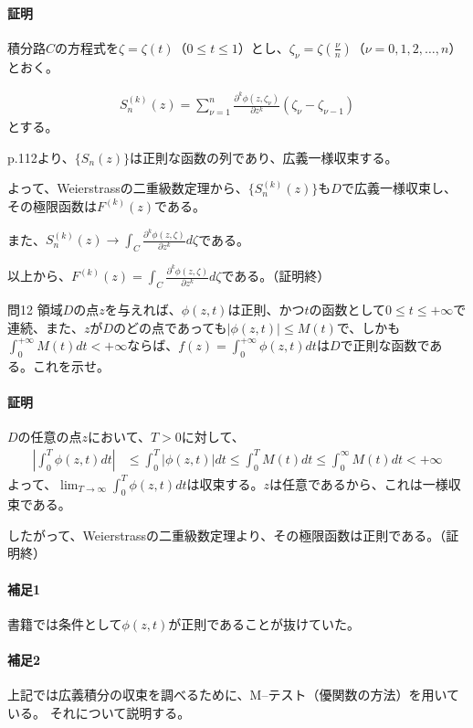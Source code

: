 \paragraph{証明}
積分路$C$の方程式を$\zeta=\zeta(t)$（$0\le t\le1$）とし、$\zeta_\nu=\zeta(\frac{\nu}{n})$（$\nu=0,1,2,\dots,n$）とおく。

\begin{align*}
    S^{(k)}_n(z)=\sum_{\nu=1}^{n}\frac{\partial^k \phi(z,\zeta_\nu)}{\partial z^k}(\zeta_\nu-\zeta_{\nu-1})
\end{align*}
とする。

p.112より、$\{S_n(z)\}$は正則な函数の列であり、広義一様収束する。

よって、Weierstrassの二重級数定理から、$\{S^{(k)}_n(z)\}$も$D$で広義一様収束し、その極限函数は$F^{(k)}(z)$である。

また、$S^{(k)}_n(z)\longrightarrow\int_{C}\frac{\partial^k\phi(z,\zeta)}{\partial z^k}d\zeta$である。

以上から、$F^{(k)}(z)=\int_{C}\frac{\partial^k\phi(z,\zeta)}{\partial z^k}d\zeta$である。（証明終）

\begin{mysimplebox}{問12}
    領域$D$の点$z$を与えれば、$\phi(z,t)$は正則、かつ$t$の函数として$0\le t\le+\infty$で連続、また、$z$が$D$のどの点であっても$|\phi(z,t)|\le M(t)$で、しかも$\int_{0}^{+\infty}M(t)dt<+\infty$ならば、$f(z)=\int_{0}^{+\infty}\phi(z,t)dt$は$D$で正則な函数である。これを示せ。
\end{mysimplebox}
\paragraph{証明}
$D$の任意の点$z$において、$T>0$に対して、
\begin{align*}
    \left|\int_{0}^{T}\phi(z,t)dt\right|
    &\le\int_{0}^{T}|\phi(z,t)|dt
    \le\int_{0}^{T}M(t)dt
    \le\int_{0}^{\infty}M(t)dt<+\infty
\end{align*}
よって、$\lim_{T\to\infty}\int_{0}^{T}\phi(z,t)dt$は収束する。$z$は任意であるから、これは一様収束である。

したがって、Weierstrassの二重級数定理より、その極限函数は正則である。（証明終）

\paragraph{補足1}
書籍では条件として$\phi(z,t)$が正則であることが抜けていた。

\paragraph{補足2}
上記では広義積分の収束を調べるために、M--テスト（優関数の方法）を用いている。
それについて説明する。

